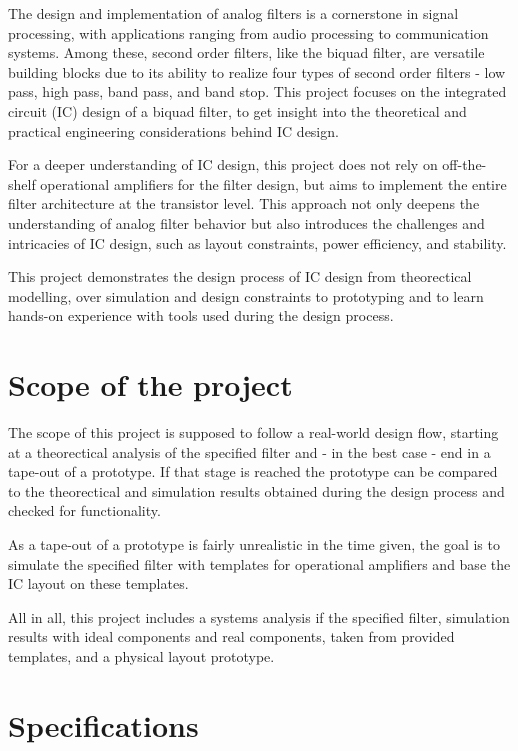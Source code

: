 \documentclass[
  letterpaper,
]{scrbook}
\begin{document}
The design and implementation of analog filters is a cornerstone in
signal processing, with applications ranging from audio processing to
communication systems. Among these, second order filters, like the
biquad filter, are versatile building blocks due to its ability to
realize four types of second order filters - low pass, high pass, band
pass, and band stop. This project focuses on the integrated circuit (IC)
design of a biquad filter, to get insight into the theoretical and
practical engineering considerations behind IC design.

For a deeper understanding of IC design, this project does not rely on
off-the-shelf operational amplifiers for the filter design, but aims to
implement the entire filter architecture at the transistor level. This
approach not only deepens the understanding of analog filter behavior
but also introduces the challenges and intricacies of IC design, such as
layout constraints, power efficiency, and stability.

This project demonstrates the design process of IC design from
theorectical modelling, over simulation and design constraints to
prototyping and to learn hands-on experience with tools used during the
design process.

\section{Scope of the project}\label{scope-of-the-project}

The scope of this project is supposed to follow a real-world design
flow, starting at a theorectical analysis of the specified filter and -
in the best case - end in a tape-out of a prototype. If that stage is
reached the prototype can be compared to the theorectical and simulation
results obtained during the design process and checked for
functionality.

As a tape-out of a prototype is fairly unrealistic in the time given,
the goal is to simulate the specified filter with templates for
operational amplifiers and base the IC layout on these templates.

All in all, this project includes a systems analysis if the specified
filter, simulation results with ideal components and real components,
taken from provided templates, and a physical layout prototype.

\section{Specifications}\label{specifications}
\end{document}
